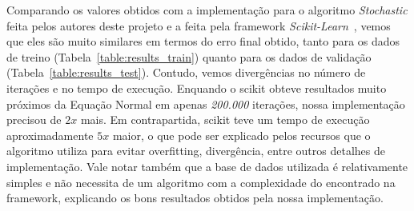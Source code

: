 \documentclass[conference]{IEEEtran}
\begin{document}
\begin{table}[H]
\centering
{}
\caption{Tabela de Resultados de Treino Para Cada Algoritmo}
\label{table:results_train}
\end{table}

\vspace{-2em}

\begin{table}[H]
	\caption{Tabela de Resultados de Validação Para Os Algoritmos Mais Eficientes}
\label{table:results_test}
\end{table}

Comparando os valores obtidos com a implementação para o algoritmo \textit{Stochastic} feita pelos autores deste projeto e a feita pela framework \textit{Scikit-Learn}~\cite{scikit}, vemos que eles são muito similares em termos do erro final obtido, tanto para os dados de treino (Tabela~\ref{table:results_train}) quanto para os dados de validação (Tabela~\ref{table:results_test}). Contudo, vemos divergências no número de iterações e no tempo de execução. Enquando o scikit obteve resultados muito próximos da Equação Normal em apenas \textit{200.000} iterações, nossa implementação precisou de $2x$ mais. Em contrapartida, scikit teve um tempo de execução aproximadamente $5x$ maior, o que pode ser explicado pelos recursos que o algoritmo utiliza para evitar overfitting, divergência, entre outros detalhes de implementação. Vale notar também que a base de dados utilizada é relativamente simples e não necessita de um algoritmo com a complexidade do encontrado na framework, explicando os bons resultados obtidos pela nossa implementação.
\end{document}
